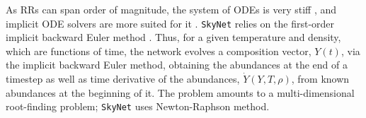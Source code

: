 %

%
As \acp{RR} can span order of magnitude, 
the system of \acp{ODE} is very stiff \citep{Timmes:1999,Hix:2005pf}, and implicit \ac{ODE} solvers 
are more suited for it \citep{Timmes:1999,Winteler:2012,Longland:2014}.
\texttt{SkyNet} relies on the first-order implicit backward Euler method \citep{Hix:1999}. %
%
Thus, for a given temperature and density, which are functions of time, 
the network evolves a composition vector, $Y(t)$, via the implicit 
backward Euler method, obtaining the abundances at the end of a timestep 
as well as time derivative of the abundances, $\dot{Y}(Y,T,\rho)$,  
from known abundances at the beginning of it. 
%
The problem amounts to a multi-dimensional 
root-finding problem; \texttt{SkyNet} uses 
Newton-Raphson method. 

